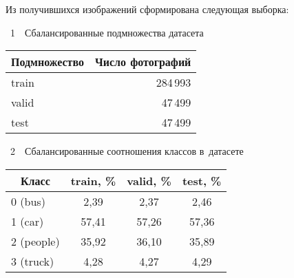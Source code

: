 \begin{multicols}{2}
Из получившихся изображений сформирована следующая выборка:
  \vspace*{12pt}
  
  \begin{center}
 \parbox{172pt}{{{\tablename~1}\ \ \small{Сбалансированные подмножества датасета
}} 
}

  \vspace*{8pt}
  
  {\small 
  \tabcolsep=8.5pt
  \begin{tabular}{|l|r|}
  \hline
  \multicolumn{1}{|c|}{Подмножество}&\multicolumn{1}{c|}{Число фотографий}\\
  \hline
   \hphantom{8mm}train&284\,993\hphantom{10mm}\\
  \hphantom{8mm}valid&47\,499\hphantom{10mm}\\
 \hphantom{8mm}test&47\,499\hphantom{10mm}\\
  \hline
  \end{tabular}
  }
  \vspace*{9pt}
  
 \end{center}

  
  


  
  

\begin{center}
\parbox{172pt}{{{\tablename~2}\ \ \small{Сбалансированные соотношения классов в~датасете
}}}

\vspace*{8pt}

{\small 
\begin{tabular}{|l|c|c|c|}
\hline
  \multicolumn{1}{|c|}{Класс}&train, \%&valid, \%&test, \%\\
  \hline
  0 (bus)&\hphantom{9}2,39&\hphantom{9}2,37&\hphantom{9}2,46\\
  1 (car)&57,41&57,26&57,36\\
  2 (people)&35,92&36,10 &35,89\\
  3 (truck)&\hphantom{9}4,28&\hphantom{9}4,27&\hphantom{9}4,29\\
  \hline
  \end{tabular}
  }
  \end{center}
 

\end{multicols}
